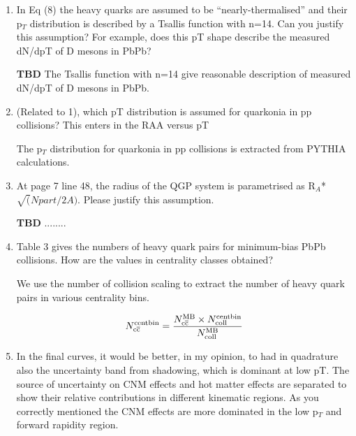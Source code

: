 \documentclass[a4paper,11pt]{article}
\begin{document}
\begin{enumerate}

\item In Eq (8) the heavy quarks are assumed to be “nearly-thermalised” and their p$_T$ distribution is described by a
  Tsallis function with n=14. Can you justify this assumption? For example, does this pT shape describe the measured dN/dpT
  of D mesons in PbPb?

{\color{red} \textbf{TBD} The Tsallis function with n=14 give reasonable description of measured dN/dpT
  of D mesons in PbPb. } 


\item (Related to 1), which pT distribution is assumed for quarkonia in pp collisions? This enters in the RAA versus pT

{\color{blue} The p$_T$ distribution for quarkonia in pp collisions is extracted from PYTHIA calculations. }

\item At page 7 line 48, the radius of the QGP system is parametrised as R$_A$*$\sqrt(Npart/2A)$. Please justify this assumption.\newline

  {\color{red} \textbf{TBD} ........}

\item Table 3 gives the numbers of heavy quark pairs for minimum-bias PbPb collisions. How are the values in centrality classes obtained?\newline
  
  {\color{blue} We use the number of collision scaling to extract the number of heavy quark pairs in various centrality bins. 
    
    \begin{equation}
      N_{\rm c\overline{c}}^{\rm centbin} = \frac{N_{\rm c\overline{c}}^{\rm MB}\times N_{\rm coll}^{\rm centbin}}{N_{\rm coll}^{\rm MB}} 
    \end{equation}
  }

\item In the final curves, it would be better, in my opinion, to had in quadrature also the uncertainty band from shadowing, which is dominant at
  low pT. \newline
  {\color{blue}
    The source of uncertainty on CNM effects and hot matter effects are separated to show their relative contributions in different kinematic regions.
    As you correctly mentioned the CNM effects are more dominated in the low p$_{T}$ and forward rapidity region.  
  }



\end{enumerate}
\end{document}
